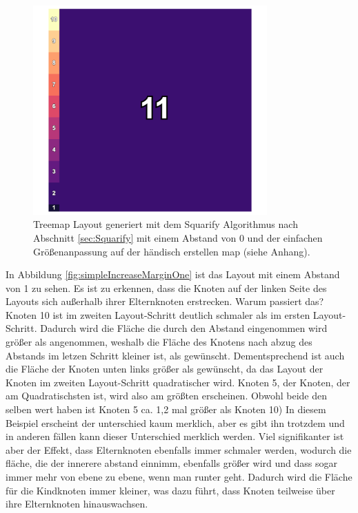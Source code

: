 \begin{figure}
    \centering
    \includegraphics[width=0.8\textwidth]{images/zeroMarginSquarifyArtifialTwo.png}
    \caption{Treemap Layout generiert mit dem Squarify Algorithmus nach Abschnitt \ref{sec:Squarify} mit einem Abstand von 0 und der einfachen Größenanpassung auf der händisch erstellen map (siehe Anhang).}
    \label{fig:zeroMarginSquarifyArtifialTwo}
\end{figure}

In Abbildung \ref{fig:simpleIncreaseMarginOne} ist das Layout mit einem Abstand von 1 zu sehen. Es ist zu erkennen, dass die Knoten auf der linken Seite des Layouts sich außerhalb ihrer Elternknoten erstrecken. Warum passiert das? Knoten 10 ist im zweiten Layout-Schritt deutlich schmaler als im ersten Layout-Schritt. Dadurch wird die Fläche die durch den Abstand eingenommen wird größer als angenommen, weshalb die Fläche des Knotens nach abzug des Abstands im letzen Schritt kleiner ist, als gewünscht. Dementsprechend ist auch die Fläche der Knoten unten links größer als gewünscht, da das Layout der Knoten im zweiten Layout-Schritt quadratischer wird. Knoten 5, der Knoten, der am Quadratischsten ist, wird also am größten erscheinen. Obwohl beide den selben wert haben ist Knoten 5 ca. 1,2 mal größer als Knoten 10) In diesem Beispiel erscheint der unterschied kaum merklich, aber es gibt ihn trotzdem und in anderen fällen kann dieser Unterschied merklich werden.
Viel signifikanter ist aber der Effekt, dass Elternknoten ebenfalls immer schmaler werden, wodurch die fläche, die der innerere abstand einnimm, ebenfalls größer wird und dass sogar immer mehr von ebene zu ebene, wenn man runter geht. Dadurch wird die Fläche für die Kindknoten immer kleiner, was dazu führt, dass Knoten teilweise über ihre Elternknoten hinauswachsen.

